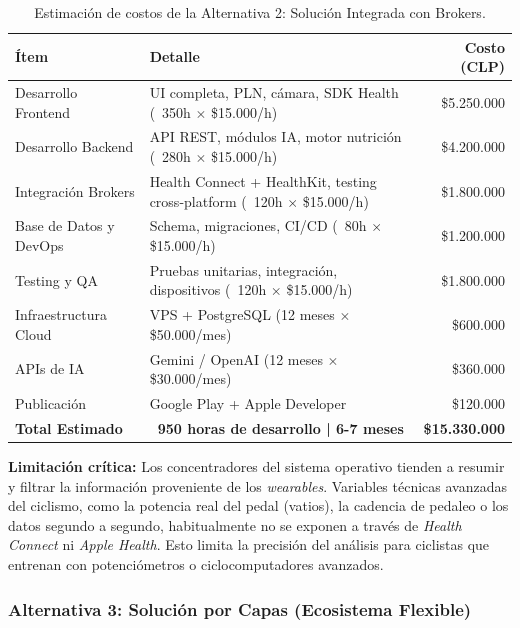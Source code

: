 \documentclass[12pt]{article}
\begin{document}
\begin{table}[h!]
    \centering
    \renewcommand{\arraystretch}{1.4}
    \begin{tabular}{|m{4cm}|m{5.5cm}|r|}
        \hline
        \rowcolor[HTML]{EFEFEF}
        \textbf{Ítem} & \textbf{Detalle} & \textbf{Costo (CLP)} \\ \hline
        Desarrollo Frontend & UI completa, PLN, cámara, SDK Health (~350h $\times$ \$15.000/h) & \$5.250.000 \\ \hline
        Desarrollo Backend & API REST, módulos IA, motor nutrición (~280h $\times$ \$15.000/h) & \$4.200.000 \\ \hline
        Integración Brokers & Health Connect + HealthKit, testing cross-platform (~120h $\times$ \$15.000/h) & \$1.800.000 \\ \hline
        Base de Datos y DevOps & Schema, migraciones, CI/CD (~80h $\times$ \$15.000/h) & \$1.200.000 \\ \hline
        Testing y QA & Pruebas unitarias, integración, dispositivos (~120h $\times$ \$15.000/h) & \$1.800.000 \\ \hline
        Infraestructura Cloud & VPS + PostgreSQL (12 meses $\times$ \$50.000/mes) & \$600.000 \\ \hline
        APIs de IA & Gemini / OpenAI (12 meses $\times$ \$30.000/mes) & \$360.000 \\ \hline
        Publicación & Google Play + Apple Developer & \$120.000 \\ \hline
        \rowcolor[HTML]{E8F5E9}
        \textbf{Total Estimado} & \textbf{~950 horas de desarrollo | 6-7 meses} & \textbf{\$15.330.000} \\ \hline
    \end{tabular}
    \caption{Estimación de costos de la Alternativa 2: Solución Integrada con Brokers.}
    \label{tab:costos_alt2}
\end{table}

\textbf{Limitación crítica:} Los concentradores del sistema operativo tienden a resumir y filtrar la información proveniente de los \textit{wearables}. Variables técnicas avanzadas del ciclismo, como la potencia real del pedal (vatios), la cadencia de pedaleo o los datos segundo a segundo, habitualmente no se exponen a través de \textit{Health Connect} ni \textit{Apple Health}. Esto limita la precisión del análisis para ciclistas que entrenan con potenciómetros o ciclocomputadores avanzados.

\newpage
\subsubsection{Alternativa 3: Solución por Capas (Ecosistema Flexible)}
\end{document}
